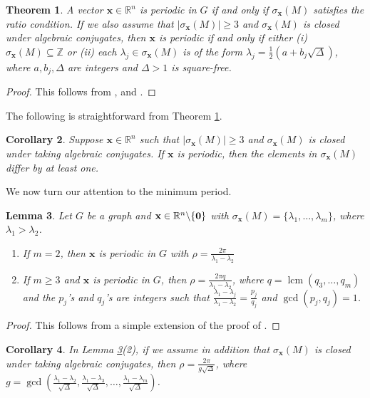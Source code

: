 \documentclass[11pt]{article}
\newtheorem{theorem}{Theorem}
\newtheorem{lemma}[theorem]{Lemma}
\newtheorem{corollary}[theorem]{Corollary}
\newcommand{\zero}{{\bf{0}}}
\newcommand{\bx}{\mathbf x}
\def\R{\mathbb{R}}
\begin{document}
\begin{theorem}
\label{Thm:rc}
A vector $\bx\in \R^n$ is periodic in $G$ if and only if $\sigma_{\bx}(M)$ satisfies the ratio condition. If we also assume that $|\sigma_{\bx}(M)|\geq 3$ and $\sigma_{\bx}(M)$ is closed under algebraic conjugates,
then $\bx$ is periodic if and only if either (i) $\sigma_{\bx}(M)\subseteq\mathbb{Z}$ or (ii) each $\lambda_j\in \sigma_{\bx}(M)$ is of the form $\lambda_j=\frac{1}{2}(a+b_j\sqrt{\Delta})$, where $a,b_j,\Delta$ are integers and $\Delta>1$ is square-free.
\end{theorem}

\begin{proof}
This follows from \cite[Corollary 7.3.1]{Coutinho2021}, and \cite[Theorem 7.6.1]{Coutinho2021}. 
\end{proof}

The following is straightforward from Theorem \ref{Thm:rc}.

\begin{corollary}
\label{Cor:specgap}
Suppose $\bx\in \R^n$ such that
$|\sigma_{\bx}(M)|\geq 3$ and $\sigma_{\bx}(M)$ is closed under taking algebraic conjugates. If $\bx$ is periodic,
then the elements in $\sigma_{\bx}(M)$ differ by at least one. 
\end{corollary}

We now turn our attention to the minimum period.

\begin{lemma}\label{Lem:minperiod}
Let $G$ be a graph and $\bx\in\R^n\backslash\{\zero\}$ with $\sigma_{\bx}(M)=\{\lambda_1,\ldots,\lambda_m\}$, where $\lambda_1>\lambda_2$.
\begin{enumerate}
\item If $m=2$, then $\bx$ is periodic in $G$ with $\rho=\frac{2\pi}{\lambda_1-\lambda_2}$
\item If $m\geq 3$ and $\bx$ is periodic in $G$, then $\rho=\frac{2\pi q}{\lambda_1-\lambda_2}$, where $q=\operatorname{lcm}(q_3,\ldots,q_{m})$ and the $p_j$'s and $q_j$'s are integers such that $\frac{\lambda_1-\lambda_j}{\lambda_1-\lambda_2}=\frac{p_j}{q_j}$ and $\operatorname{gcd}(p_j,q_j)=1$.
\end{enumerate}
\end{lemma}

\begin{proof}
This follows from a simple extension of the proof of \cite[Theorem 5]{Monterde2022}.
\end{proof}

\begin{corollary}
\label{Lem:minperiod1}
In Lemma \ref{Lem:minperiod}(2), if we assume in addition that $\sigma_{\bx}(M)$ is closed under taking algebraic conjugates, then $\rho=\frac{2\pi}{g\sqrt{\Delta}}$, where $g=\operatorname{gcd}(\frac{\lambda_1-\lambda_2}{\sqrt{\Delta}},\frac{\lambda_1-\lambda_3}{\sqrt{\Delta}},\ldots,\frac{\lambda_1-\lambda_m}{\sqrt{\Delta}})$.
\end{corollary}
\end{document}

